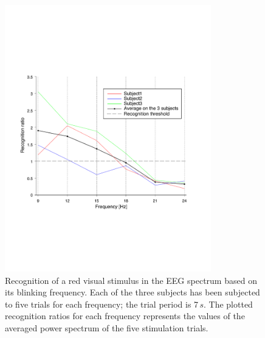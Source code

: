 \documentclass[smallextended]{svjour3}
\begin{document}
\begin{figure}
\center
\includegraphics[width=0.8\textwidth]{figures/graph-frequences.pdf}
\caption{Recognition of a red visual stimulus in the EEG spectrum based on its blinking frequency. Each of the three subjects has been subjected to five trials for each frequency; the trial period is 7\,$s$. The plotted recognition ratios for each frequency represents the values of the averaged power spectrum of the five stimulation trials.} \label{fig:graph-frequences}
\end{figure}
\end{document}

